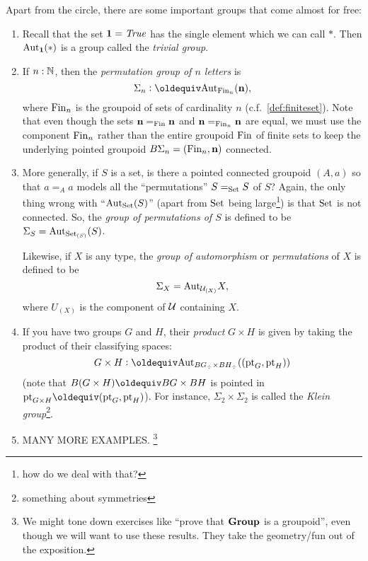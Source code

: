 \begin{example}\label{ex:groups}
  Apart from the circle, there are some important groups that come almost for free:
  \begin{enumerate}
  \item Recall that the set $\mathbf{1} =\mathop{\mathit{True}}$ has the single element which we can call $*$. Then $\mathrm{Aut}_{\mathbf{1} }(*)$ is a group called the \emph{trivial group}.
  \item If $n:\mathbb{N}$, then the \emph{permutation group of $n$ letters} is 
$$\Sigma_n\defequi\aut_{\fin_n}(\bn{n} ),$$ 
where $\mathrm{Fin}_n$ is the groupoid of sets of cardinality $n$ (c.f.~\ref{def:finiteset}).  Note that even though the sets $\mathbf{n} =_{\mathrm{Fin}}\mathbf{n} $ and $\mathbf{n} =_{\mathrm{Fin}_n}\mathbf{n} $ are equal, we must use the component $\mathrm{Fin}_n$ rather than the entire groupoid $\mathrm{Fin}$ of finite sets to keep the underlying pointed groupoid $B\Sigma_n=(\mathrm{Fin}_n,\mathbf{n} )$ connected.
  \item More generally, if $S$ is a set, is there a pointed connected groupoid $(A,a)$ so that $a=_Aa$ models all the ``permutations'' $S=_{\mathord{\mathrm{Set}}}S$ of $S$?  Again, the only thing wrong with ``$\mathrm{Aut}_{\mathord{\mathrm{Set}}}(S)$'' (apart from $\mathord{\mathrm{Set}}$ being large\footnote{how do we deal with that?}) is that $\mathord{\mathrm{Set}}$ is not connected. 
%
 So, 
the \emph{group of permutations of $S$} is defined to be $\Sigma_{S}=\mathrm{Aut}_{\mathord{\mathrm{Set}}_{(S)}}(S)$.  

Likewise, if $X$ is any type, the \emph{group of automorphism} or \emph{permutations} of $X$ is defined to be 
$$\Sigma_X=\mathrm{Aut}_{\mathcal{U}_{(X)}}X,$$
 where $U_{(X)}$ is the component of $\mathcal{U}$ containing $X$.
\item If you have two groups $G$ and $H$, their {\em product} $G\times H$ is given by taking the product of their classifying spaces:
$$G\times H\defequi\aut_{BG_\div\times BH_\div}((\pt_G,\pt_H))$$
(note that $B(G\times H)\oldequiv BG\times BH$ is pointed in $\pt_{G\times H}\oldequiv(\pt_G,\pt_H)$).  
For instance, $\Sigma_2\times\Sigma_2$ is called the {\em Klein group}\footnote{something about symmetries}.
\item MANY MORE EXAMPLES.  \footnote{We might tone down exercises like ``prove that $\mathbf{Group}$ is a groupoid'', even though we will want to use these results.  They take the geometry/fun out of the exposition.}
  \end{enumerate}
\end{example}
